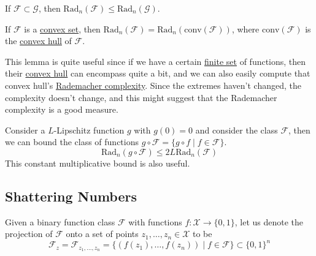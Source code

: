   \begin{lemma}
    \label{thm:bigger-class-bigger-complexity}
    If $\mathcal{F} \subset \mathcal{G}$, then $\mathrm{Rad}_n (\mathcal{F}) \leq \mathrm{Rad}_n (\mathcal{G})$.
  \end{lemma}

  \begin{lemma}
    \label{thm:convex-hull}
    If $\mathcal{F}$ is a \hyperref[mv-def:convex-set]{convex set}, then $\mathrm{Rad}_n (\mathcal{F}) = \mathrm{Rad}_n (\mathrm{conv}(\mathcal{F}))$, where $\mathrm{conv}(\mathcal{F})$ is the \hyperref[alg-def:convex-hull]{convex hull} of $\mathcal{F}$.
  \end{lemma}

  This lemma is quite useful since if we have a certain \hyperref[st-def:finite-set]{finite set} of functions, then their \hyperref[thm:convex-hull]{convex hull} can encompass quite a bit, and we can also easily compute that convex hull's \hyperref[def:rademacher-complexity]{Rademacher complexity}. Since the extremes haven't changed, the complexity doesn't change, and this might suggest that the Rademacher complexity is a good measure. 

  \begin{lemma}
    \label{thm:change-of-complexity-with-lipschitz-functions}
    Consider a $L$-Lipschitz function $g$  with $g(0) = 0$ and consider the class $\mathcal{F}$, then we can bound the class of functions $g \circ \mathcal{F} = \{ g \circ f \mid f \in \mathcal{F} \}$. 
    \begin{equation}
      \mathrm{Rad}_n (g \circ \mathcal{F}) \leq 2 L \mathrm{Rad}_n (\mathcal{F})
    \end{equation}
    This constant multiplicative bound is also useful. 
  \end{lemma}

\subsection{Shattering Numbers}

  \begin{definition}
    \label{def:projection-of-function-class-onto-points}
    Given a binary function class $\mathcal{F}$ with functions $f: \mathcal{X} \rightarrow \{0, 1\}$, let us denote the projection of $\mathcal{F}$ onto a set of points $z_1, \ldots, z_n \in \mathcal{X}$ to be 
    \begin{equation}
      \mathcal{F}_z = \mathcal{F}_{z_1, \ldots, z_n} = \{ (f(z_1), \ldots, f(z_n)) \mid f \in \mathcal{F} \} \subset \{0, 1\}^n
    \end{equation}
  \end{definition}

